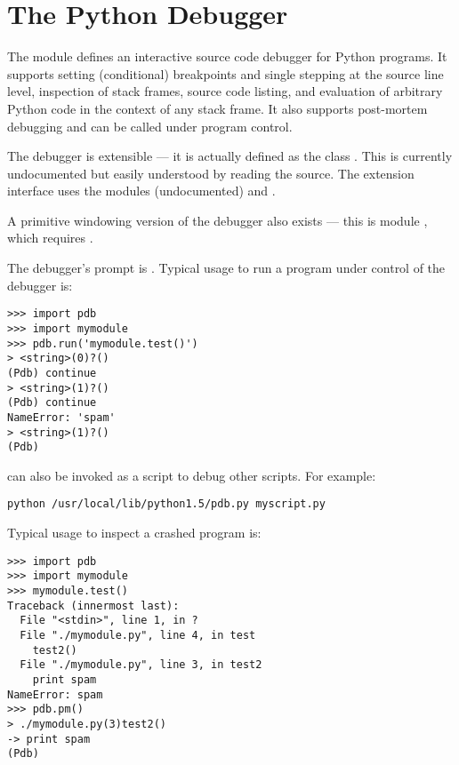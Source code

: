 \chapter{The Python Debugger}



The module  defines an interactive source code
debugger for Python programs.  It supports setting
(conditional) breakpoints and single stepping at the source line
level, inspection of stack frames, source code listing, and evaluation
of arbitrary Python code in the context of any stack frame.  It also
supports post-mortem debugging and can be called under program
control.

The debugger is extensible --- it is actually defined as the class
.
This is currently undocumented but easily understood by reading the
source.  The extension interface uses the modules
 (undocumented) and
.

A primitive windowing version of the debugger also exists --- this is
module , which requires
.

The debugger's prompt is .
Typical usage to run a program under control of the debugger is:

\begin{verbatim}
>>> import pdb
>>> import mymodule
>>> pdb.run('mymodule.test()')
> <string>(0)?()
(Pdb) continue
> <string>(1)?()
(Pdb) continue
NameError: 'spam'
> <string>(1)?()
(Pdb) 
\end{verbatim}

 can also be invoked as
a script to debug other scripts.  For example:

\begin{verbatim}
python /usr/local/lib/python1.5/pdb.py myscript.py
\end{verbatim}

Typical usage to inspect a crashed program is:

\begin{verbatim}
>>> import pdb
>>> import mymodule
>>> mymodule.test()
Traceback (innermost last):
  File "<stdin>", line 1, in ?
  File "./mymodule.py", line 4, in test
    test2()
  File "./mymodule.py", line 3, in test2
    print spam
NameError: spam
>>> pdb.pm()
> ./mymodule.py(3)test2()
-> print spam
(Pdb) 
\end{verbatim}

